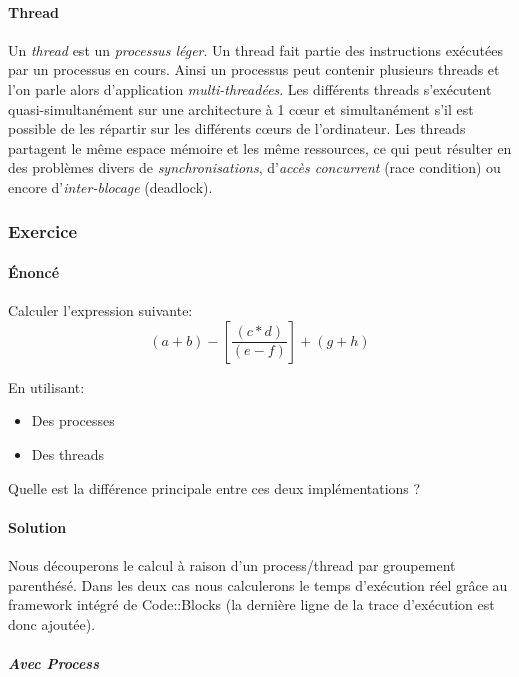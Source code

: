 \documentclass[a4paper, 12pt]{article}
\begin{document}
\paragraph{Thread\\}
Un \emph{thread} est un \emph{processus léger}. Un thread fait partie des instructions exécutées par un processus en cours. Ainsi un processus peut contenir plusieurs threads et l'on parle alors d'application \emph{multi-threadées}. Les différents threads s'exécutent quasi-simultanément sur une architecture à 1 cœur et simultanément s'il est possible de les répartir sur les différents cœurs de l'ordinateur. Les threads partagent le même espace mémoire et les même ressources, ce qui peut résulter en des problèmes divers de \emph{synchronisations}, d'\emph{accès concurrent} (race condition) ou encore d'\emph{inter-blocage} (deadlock).

\subsubsection{Exercice}

\paragraph{Énoncé\\}

Calculer l'expression suivante:
\[
    (a + b) - \left[ \frac{(c*d)}{(e-f)} \right] + (g+h)
\]

En utilisant:
\begin{itemize}
    \item Des processes
    \item Des threads
\end{itemize}

Quelle est la différence principale entre ces deux implémentations ?

\paragraph{Solution\\}
Nous découperons le calcul à raison d'un process/thread par groupement parenthésé. 
Dans les deux cas nous calculerons le temps d'exécution réel grâce au framework intégré de Code::Blocks (la dernière ligne de la trace d'exécution est donc ajoutée).

\subparagraph{Avec Process\\}


\end{document}
